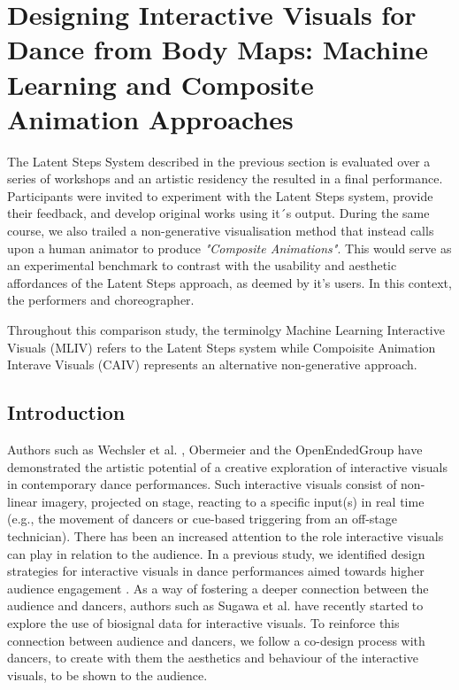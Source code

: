 \section{Designing Interactive Visuals for Dance from Body Maps: Machine Learning and Composite Animation Approaches}
\label{case_studies:modi_dis}

The Latent Steps System described in the previous section is evaluated over a series of workshops and an artistic residency the resulted in a final performance. Participants were invited to experiment with the Latent Steps system, provide their feedback, and develop original works using it´s output. During the same course, we also trailed a non-generative visualisation method that instead calls upon a human animator to produce \textit{"Composite Animations"}. This would serve as an experimental benchmark to contrast with the usability and aesthetic affordances of the Latent Steps approach, as deemed by it's users. In this context, the performers and choreographer.

Throughout this comparison study, the terminolgy Machine Learning Interactive Visuals (MLIV) refers to the Latent Steps system while Compoisite Animation Interave Visuals (CAIV) represents an alternative non-generative approach.

\subsection{Introduction}

Authors such as Wechsler et al. \cite{weis_eyecon_2004}, Obermeier \cite{monteverdi_klaus_2007} and the OpenEndedGroup \cite{downie_choreographing_2005} have demonstrated the artistic potential of a creative exploration of interactive visuals in contemporary dance performances. Such interactive visuals consist of non-linear imagery, projected on stage, reacting to a specific input(s) in real time (e.g., the movement of dancers or cue-based triggering from an off-stage technician). There has been an increased attention to the role interactive visuals can play in relation to the audience. In a previous study, we identified design strategies for interactive visuals in dance performances aimed towards higher audience engagement \cite{correia_connected_2021}. As a way of fostering a deeper connection between the audience and dancers, authors such as Sugawa et al. \cite{sugawa_boiling_2021} have recently started to explore the use of biosignal data for interactive visuals. To reinforce this connection between audience and dancers, we follow a co-design process with dancers, to create with them the aesthetics and behaviour of the interactive visuals, to be shown to the audience.

